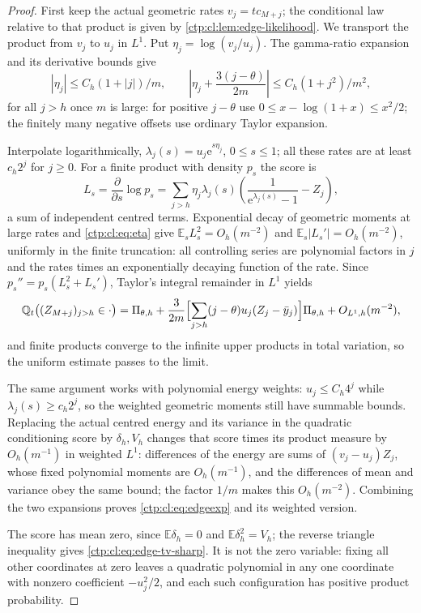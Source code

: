 \documentclass[11pt,a4paper]{article}
\numberwithin{equation}{section}
\theoremstyle{definition}
\theoremstyle{remark}
\newcommand{\e}{\mathrm e}
\newcommand{\E}{\mathbb E}
\newcommand{\Q}{\mathbb Q}
\begin{document}
\begin{proof}
First keep the actual geometric rates $v_j=tc_{M+j}$; the conditional law
relative to that product is given by \cref{ctp:cl:lem:edge-likelihood}. We
transport the product from $v_j$ to $u_j$ in $L^1$. Put
$\eta_j=\log(v_j/u_j)$. The gamma-ratio expansion and its derivative bounds
give
\begin{equation}\label{ctp:cl:eq:eta}
 |\eta_j|\le C_h(1+|j|)/m,\qquad
 \left|\eta_j+\frac{3(j-\theta)}{2m}\right|\le C_h(1+j^2)/m^2,
\end{equation}
for all $j>h$ once $m$ is large: for positive $j-\theta$ use
$0\le x-\log(1+x)\le x^2/2$; the finitely many negative offsets use ordinary
Taylor expansion.

Interpolate logarithmically, $\lambda_j(s)=u_j\e^{s\eta_j}$, $0\le s\le1$;
all these rates are at least $c_h2^j$ for $j\ge0$. For a finite product with
density $p_s$ the score is
\[
 L_s=\frac{\partial}{\partial s}\log p_s=\sum_{j>h}\eta_j\lambda_j(s)
 \left(\frac1{\e^{\lambda_j(s)}-1}-Z_j\right),
\]
a sum of independent centred terms. Exponential decay of geometric moments
at large rates and \eqref{ctp:cl:eq:eta} give $\E_sL_s^2=O_h(m^{-2})$ and
$\E_s|L_s'|=O_h(m^{-2})$, uniformly in the finite truncation: all
controlling series are polynomial factors in $j$ and the rates times an
exponentially decaying function of the rate. Since $p_s''=p_s(L_s^2+L_s')$,
Taylor's integral remainder in $L^1$ yields
\[
 \Q_{t}\bigl((Z_{M+j})_{j>h}\in\cdot\bigr)=\Pi_{\theta,h}
 +\frac3{2m}\Bigl[\sum_{j>h}(j-\theta)u_j(Z_j-\bar y_j)\Bigr]\Pi_{\theta,h}
 +O_{L^1,h}(m^{-2}),
\]
and finite products converge to the infinite upper products in total
variation, so the uniform estimate passes to the limit.

The same argument works with polynomial energy weights: $u_j\le C_h4^j$
while $\lambda_j(s)\ge c_h2^j$, so the weighted geometric moments still have
summable bounds. Replacing the actual centred energy and its variance in the
quadratic conditioning score by $\delta_h,V_h$ changes that score times its
product measure by $O_h(m^{-1})$ in weighted $L^1$: differences of the
energy are sums of $(v_j-u_j)Z_j$, whose fixed polynomial moments are
$O_h(m^{-1})$, and the differences of mean and variance obey the same
bound; the factor $1/m$ makes this $O_h(m^{-2})$. Combining the two
expansions proves \eqref{ctp:cl:eq:edgeexp} and its weighted version.

The score has mean zero, since $\E\delta_h=0$ and $\E\delta_h^2=V_h$; the
reverse triangle inequality gives \eqref{ctp:cl:eq:edge-tv-sharp}. It is not
the zero variable: fixing all other coordinates at zero leaves a quadratic
polynomial in any one coordinate with nonzero coefficient $-u_j^2/2$, and
each such configuration has positive product probability.
\end{proof}
\end{document}
